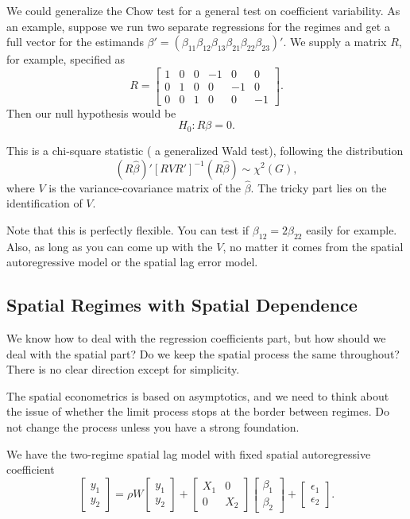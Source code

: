 \documentclass[11pt,a4paper]{amsart}
\theoremstyle{plain}
\theoremstyle{definition}
\begin{document}
 We could generalize the Chow test for a general test on coefficient variability. As an example, suppose we run two separate regressions for the regimes and get a full vector for the estimands $\beta' = (\beta_{11} \beta_{12} \beta_{13} \beta_{21} \beta_{22} \beta_{23})'$. We supply a matrix $R$, for example, specified as 
 \[	R  = \begin{bmatrix}
 	1 & 0 & 0 & -1 & 0 & 0 \\
 	0 & 1 & 0 & 0 & -1 & 0 \\
 	0 & 0 & 1 & 0 &  0 & -1
 \end{bmatrix}.	\]
Then our null hypothesis would be 
\[	H_{0}: R\beta = 0.	\]

This is a chi-square statistic ( a generalized Wald test), following the distribution 
\[	(R\hat{\beta})'[RVR']^{-1}(R\hat{\beta}) \sim \chi^{2}(G),	\]
where $V$ is the variance-covariance matrix of the $\hat{\beta}$. The tricky part lies on the identification of $V$. 

Note that this is perfectly flexible. You can test if $\beta_{12} = 2 \beta_{22}$ easily for example. Also, as long as you can come up with the $V$, no matter it comes from the spatial autoregressive model or the spatial lag error model.

\subsection{Spatial Regimes with Spatial Dependence}
We know how to deal with the regression coefficients part, but how should we deal with the spatial part? Do we keep the spatial process the same throughout? There is no clear direction except for simplicity. 

The spatial econometrics is based on asymptotics, and we need to think about the issue of whether the limit process stops at the border between regimes. Do not change the process unless you have a strong foundation. 

We have the two-regime spatial lag model with fixed spatial autoregressive coefficient
\[	\begin{bmatrix}
	y_{1}\\
	y_{2}
\end{bmatrix} = \rho W
\begin{bmatrix}
	y_{1}\\
	y_{2}
\end{bmatrix} + 
\begin{bmatrix}
	X_{1} & 0 \\
	0 & X_{2}
\end{bmatrix} 
\begin{bmatrix}
	\beta_{1}\\
	\beta_{2}
\end{bmatrix} + 
\begin{bmatrix}
	\epsilon_{1}\\
	\epsilon_{2}
\end{bmatrix}.	\]
\end{document}
